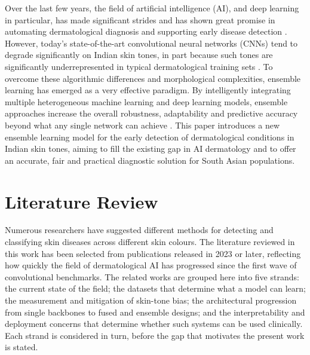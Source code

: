 \documentclass[pdflatex,sn-mathphys-num]{sn-jnl}%
\begin{document}
Over the last few years, the field of artificial intelligence (AI), and deep learning in
particular, has made significant strides and has shown great promise in automating
dermatological diagnosis and supporting early disease detection \cite{ref2}. However,
today's state-of-the-art convolutional neural networks (CNNs) tend to degrade significantly
on Indian skin tones, in part because such tones are significantly underrepresented in
typical dermatological training sets \cite{ref4}. To overcome these algorithmic differences
and morphological complexities, ensemble learning has emerged as a very effective paradigm.
By intelligently integrating multiple heterogeneous machine learning and deep learning
models, ensemble approaches increase the overall robustness, adaptability and predictive
accuracy beyond what any single network can achieve \cite{ref14,ref15}. This paper
introduces a new ensemble learning model for the early detection of dermatological
conditions in Indian skin tones, aiming to fill the existing gap in AI dermatology and to
offer an accurate, fair and practical diagnostic solution for South Asian populations.

\section{Literature Review}\label{sec:litreview}

Numerous researchers have suggested different methods for detecting and classifying skin
diseases across different skin colours. The literature reviewed in this work has been
selected from publications released in 2023 or later, reflecting how quickly the field of
dermatological AI has progressed since the first wave of convolutional benchmarks. The
related works are grouped here into five strands: the current state of the field; the
datasets that determine what a model can learn; the measurement and mitigation of skin-tone
bias; the architectural progression from single backbones to fused and ensemble designs;
and the interpretability and deployment concerns that determine whether such systems can be
used clinically. Each strand is considered in turn, before the gap that motivates the
present work is stated.
\end{document}
